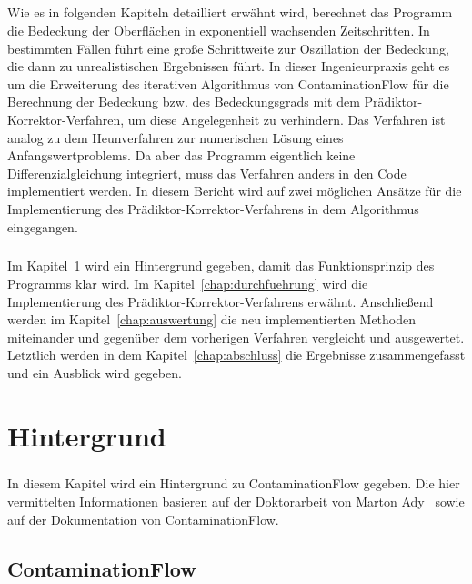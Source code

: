 \documentclass{listhesis}
\begin{document}
\paragraph{}
Wie es in folgenden Kapiteln detailliert erwähnt wird, berechnet das Programm die Bedeckung der Oberflächen in exponentiell wachsenden Zeitschritten. In bestimmten Fällen führt eine große Schrittweite zur Oszillation der Bedeckung, die dann zu unrealistischen Ergebnissen führt. In dieser Ingenieurpraxis geht es um die Erweiterung des iterativen Algorithmus von ContaminationFlow für die Berechnung der Bedeckung bzw. des Bedeckungsgrads mit dem Prädiktor-Korrektor-Verfahren, um diese Angelegenheit zu verhindern. Das Verfahren ist analog zu dem Heunverfahren zur numerischen Lösung eines Anfangswertproblems. Da aber das Programm eigentlich keine Differenzialgleichung integriert, muss das Verfahren anders in den Code implementiert werden. In diesem Bericht wird auf zwei möglichen Ansätze für die Implementierung des Prädiktor-Korrektor-Verfahrens in dem Algorithmus eingegangen. 
\paragraph{}
Im Kapitel~\ref{chap:hintergrund} wird ein Hintergrund gegeben, damit das Funktionsprinzip des Programms klar wird. Im Kapitel~\ref{chap:durchfuehrung} wird die Implementierung des Prädiktor-Korrektor-Verfahrens  erwähnt. Anschließend werden im Kapitel~\ref{chap:auswertung} die neu implementierten Methoden miteinander und gegenüber dem vorherigen Verfahren vergleicht und ausgewertet. Letztlich werden in dem Kapitel~\ref{chap:abschluss} die Ergebnisse zusammengefasst und ein Ausblick wird gegeben.

\chapter{Hintergrund} \label{chap:hintergrund}
\paragraph{}
In diesem Kapitel wird ein Hintergrund zu ContaminationFlow gegeben. Die hier vermittelten Informationen basieren auf der Doktorarbeit von Marton Ady~\cite{martonady} sowie auf der Dokumentation von ContaminationFlow.

\section{ContaminationFlow} \label{section:contaminationflow}
\end{document}
